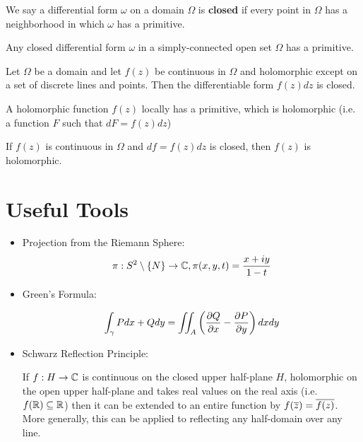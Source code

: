 \documentclass{article}
\begin{document}
\begin{definition}
  We say a differential form \(\omega\) on a domain \(\Omega\) is \textbf{closed} if every point in \(\Omega\) has a neighborhood in which \(\omega\) has a primitive.
\end{definition}

\begin{theorem}
  Any closed differential form \(\omega\) in a simply-connected open set \(\Omega\) has a primitive.
\end{theorem}

\begin{theorem}
  Let \(\Omega\) be a domain and let \(f(z)\) be continuous in \(\Omega\) and holomorphic except on a set of discrete lines and points. Then the differentiable form \(f(z)dz\) is closed.
\end{theorem}

\begin{corollary}
  A holomorphic function \(f(z)\) locally has a primitive, which is holomorphic (i.e. a function \(F\) such that \(dF = f(z)dz\))
\end{corollary}

\begin{corollary}
  If \(f(z)\) is continuous in \(\Omega\) and \(df = f(z)dz\) is closed, then \(f(z)\) is holomorphic.
\end{corollary}

\section{Useful Tools}

\begin{itemize}

  \item Projection from the Riemann Sphere:
  \begin{equation}
    \pi: S^2 \setminus \{N\} \to \mathbb{C}, \pi(x, y, t) = \frac{x + iy}{1 - t}
  \end{equation}

  \item Green's Formula:
  \begin{theorem}
    \begin{equation}
      \int_\gamma Pdx + Qdy
      = \iint_A\left({\frac{\partial {Q}}{\partial {x}}} - {\frac{\partial {P}}{\partial {y}}}\right)dxdy
    \end{equation}
  \end{theorem}

  \item Schwarz Reflection Principle:
  \begin{theorem}
    If \(f: H \to \mathbb{C}\) is continuous on the closed upper half-plane \(H\), holomorphic on the open upper half-plane and takes real values on the real axis (i.e. \(f(\mathbb{R}) \subseteq \mathbb{R}\)) then it can be extended to an entire function by \(f(\overline{z}) = \overline{f(z)}\). More generally, this can be applied to reflecting any half-domain over any line.
  \end{theorem}

\end{itemize}
\end{document}
